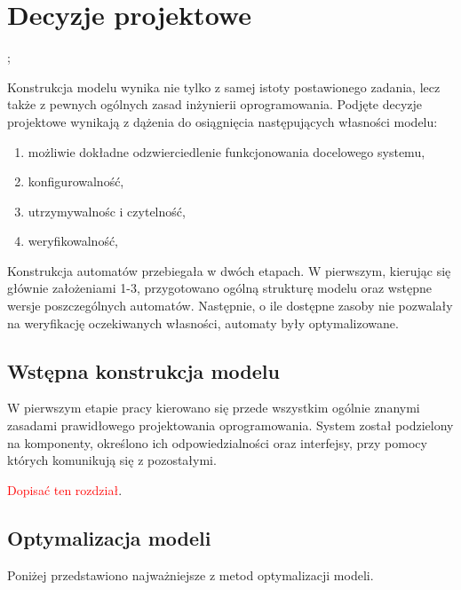 \documentclass{pracamgr}
\newcommand{\todo}[1]{\textcolor{red}{#1}}
\newcommand{\todocite}{\todo{[source]}}
\theoremstyle{plain}
\begin{document}
\section{Decyzje projektowe}
\label{s:models:project};

Konstrukcja modelu wynika nie tylko z samej istoty postawionego
zadania, lecz także z pewnych ogólnych zasad inżynierii
oprogramowania. Podjęte decyzje projektowe wynikają z dążenia do
osiągnięcia następujących własności modelu:

\begin{enumerate}
  \item możliwie dokładne odzwierciedlenie funkcjonowania docelowego systemu,
  \item konfigurowalność,
  \item utrzymywalnośc i czytelność,
  \item weryfikowalność,
\end{enumerate}
Konstrukcja automatów przebiegała w dwóch etapach. W pierwszym,
kierując się głównie założeniami 1-3, przygotowano ogólną strukturę
modelu oraz wstępne wersje poszczególnych automatów. Następnie, o ile
dostępne zasoby nie pozwalały na weryfikację oczekiwanych własności,
automaty były optymalizowane.

\subsection{Wstępna konstrukcja modelu}

W pierwszym etapie pracy kierowano się przede wszystkim
ogólnie znanymi zasadami prawidłowego projektowania oprogramowania.
System został podzielony na komponenty, określono ich
odpowiedzialności oraz interfejsy, przy pomocy których komunikują się
z pozostałymi.


\todo{Dopisać ten rozdział}.

\subsection{Optymalizacja modeli}
\label{s:models:opt}

Poniżej przedstawiono najważniejsze z metod optymalizacji modeli.
\end{document}
